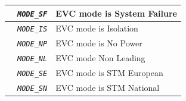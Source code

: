 \documentclass{template/openetcs}
\begin{document}
\begin{itemize}
\begin{longtable}{|l|l|l|}
			\hline

			&	\begin{minipage}[t]{0.40\linewidth} \emph{\texttt{MODE\_SF}} \end{minipage}
			&	\begin{minipage}[t]{0.38\linewidth} EVC mode is System Failure \end{minipage} \\ 

			\hline

			&	\begin{minipage}[t]{0.40\linewidth} \emph{\texttt{MODE\_IS}} \end{minipage}
			&	\begin{minipage}[t]{0.38\linewidth} EVC mode is Isolation \end{minipage} \\ 

			\hline

			&	\begin{minipage}[t]{0.40\linewidth} \emph{\texttt{MODE\_NP}} \end{minipage}
			&	\begin{minipage}[t]{0.38\linewidth} EVC mode is No Power \end{minipage} \\ 
	
			\hline
	
			&	\begin{minipage}[t]{0.40\linewidth} \emph{\texttt{MODE\_NL}} \end{minipage}
			&	\begin{minipage}[t]{0.38\linewidth} EVC mode Non Leading \end{minipage} \\ 
	
			\hline
	
			&	\begin{minipage}[t]{0.40\linewidth} \emph{\texttt{MODE\_SE}} \end{minipage}
			&	\begin{minipage}[t]{0.38\linewidth} EVC mode is STM European \end{minipage} \\ 
	
			\hline
	
			&	\begin{minipage}[t]{0.40\linewidth} \emph{\texttt{MODE\_SN}} \end{minipage}
			&	\begin{minipage}[t]{0.38\linewidth} EVC mode is STM National \end{minipage} \\ 
	

\end{longtable}
\end{itemize}
\end{document}
